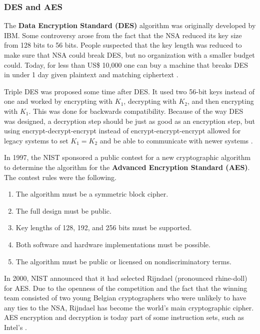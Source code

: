 \subsubsection{DES and AES}

The \textbf{Data Encryption Standard (DES)} algorithm was originally developed by IBM.
Some controversy arose from the fact that the NSA reduced its key size from 128 bits to 56 bits.
People suspected that the key length was reduced to make sure that NSA could break DES, but no organization with a smaller budget could.
Today, for less than US\$ 10,000 one can buy a machine that breaks DES in under 1 day given plaintext and matching ciphertext \cite[p.~782]{computer-networks-tanenbaum-2012}.

Triple DES was proposed some time after DES. It used two 56-bit keys instead of one and worked by encrypting with \(K_1\), decrypting with \(K_2\), and then encrypting with \(K_1\).
This was done for backwards compatibility.
Because of the way DES was designed, a decryption step should be just as good as an encryption step, but using encrypt-decrypt-encrypt instead of encrypt-encrypt-encrypt allowed for legacy systems to set \(K_1 = K_2\) and be able to communicate with newer systems \cite[p.~783]{computer-networks-tanenbaum-2012}.

In 1997, the NIST sponsored a public contest for a new cryptographic algorithm to determine the algorithm for the \textbf{Advanced Encryption Standard (AES)}.
The contest rules were the following.

\begin{enumerate}
\item The algorithm must be a symmetric block cipher.
\item The full design must be public.
\item Key lengths of 128, 192, and 256 bits must be supported.
\item Both software and hardware implementations must be possible.
\item The algorithm must be public or licensed on nondiscriminatory terms.
\end{enumerate}

In 2000, NIST announced that it had selected Rijndael (pronounced rhine-doll) for AES.
Due to the openness of the competition and the fact that the winning team consisted of two young Belgian cryptographers who were unlikely to have any ties to the NSA, Rijndael has become the world's main cryptographic cipher.
AES encryption and decryption is today part of some instruction sets, such as Intel's \cite[p.~784]{computer-networks-tanenbaum-2012}.

